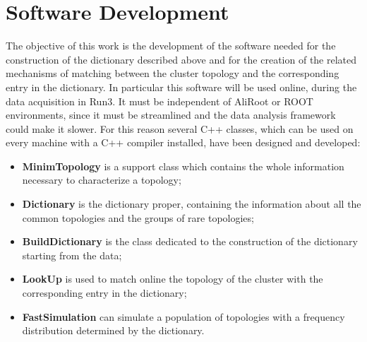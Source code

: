\section{Software Development}
The objective of this work is the development of the software needed for the construction of the dictionary described above and for the creation of the related mechanisms of matching between the cluster topology and the corresponding entry in the dictionary. In particular this software will be used online, during the data acquisition in Run3. It must be independent of AliRoot or ROOT environments, since it must be streamlined and the data analysis framework could make it slower. For this reason several C++ classes, which can be used on every machine with a C++ compiler installed, have been designed and developed:
\begin{itemize}
 \item \textbf{MinimTopology} is a support class which contains the whole information necessary to characterize a topology;
 \item \textbf{Dictionary} is the dictionary proper, containing the information about all the common topologies and the groups of rare topologies;
 \item \textbf{BuildDictionary} is the class dedicated to the construction of the dictionary starting from the data;
 \item \textbf{LookUp} is used to match online the topology of the cluster with the corresponding entry in the dictionary;
 \item \textbf{FastSimulation} can simulate a population of topologies with a frequency distribution determined by the dictionary. 
\end{itemize}

